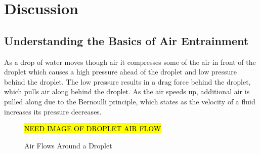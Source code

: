 \documentclass[12pt,oneside]{book}
\begin{document}




\chapter{Discussion}

\section{Understanding the Basics of Air Entrainment}
As a drop of water moves though air it compresses some of the air in front of the droplet which causes a high pressure ahead of the droplet and low pressure behind the droplet. The low pressure results in a drag force behind the droplet, which pulls air along behind the droplet. As the air speeds up, additional air is pulled along due to the Bernoulli principle, which states as the velocity of a fluid increases its pressure decreases. 

\begin{figure}[!ht]
\hl{NEED IMAGE OF DROPLET AIR FLOW}
\caption{Air Flows Around a Droplet}
\label{fig:droplet_flow}
\end{figure}
\end{document}
